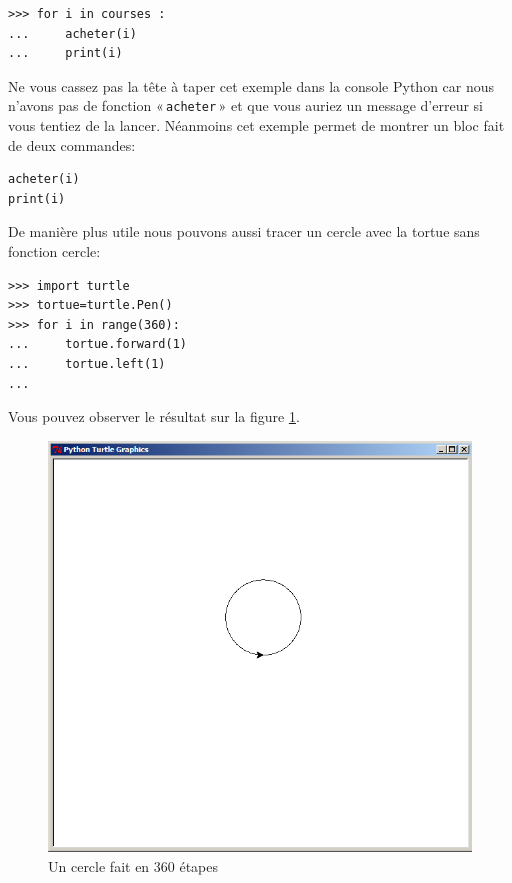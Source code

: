 \begin{Verbatim}[frame=single,rulecolor=\color{gray}, label=ne pas saisir]
>>> for i in courses :
... 	acheter(i)
... 	print(i)
\end{Verbatim}

Ne vous cassez pas la tête à taper cet exemple dans la console Python car nous n'avons pas de fonction « \texttt{acheter} » et que vous auriez un message d'erreur si vous tentiez de la lancer. 
Néanmoins cet exemple permet de montrer un bloc fait de deux commandes:

\begin{Verbatim}[frame=single,rulecolor=\color{gray}, label=ne pas saisir]
acheter(i)
print(i)
\end{Verbatim}

De manière plus utile nous pouvons aussi tracer un cercle avec la tortue sans fonction cercle:

\begin{Verbatim}[frame=single,rulecolor=\color{green}, label=à taper avec attention]
>>> import turtle
>>> tortue=turtle.Pen()
>>> for i in range(360):
...     tortue.forward(1)
...     tortue.left(1)
...
\end{Verbatim}

Vous pouvez observer le résultat sur la figure \ref{fig:cercle}.
\begin{figure}[H]
\centering
\includegraphics[scale=0.4]{images/cercle.png}
\caption{Un cercle fait en 360 étapes}
\label{fig:cercle}
\end{figure}



